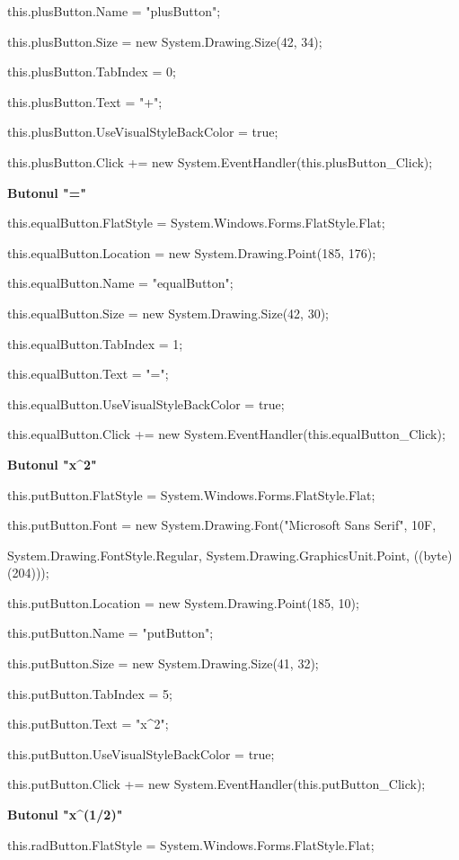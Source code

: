     this.plusButton.Name = "plusButton";
    
    this.plusButton.Size = new System.Drawing.Size(42, 34);
    
    this.plusButton.TabIndex = 0;
    
    this.plusButton.Text = "+";
    
    this.plusButton.UseVisualStyleBackColor = true;
    
    this.plusButton.Click += new System.EventHandler(this.plusButton_Click);

	
	\textbf{Butonul "="}
	
	this.equalButton.FlatStyle = System.Windows.Forms.FlatStyle.Flat;
    
    this.equalButton.Location = new System.Drawing.Point(185, 176);
    
    this.equalButton.Name = "equalButton";
    
    this.equalButton.Size = new System.Drawing.Size(42, 30);
    
    this.equalButton.TabIndex = 1;
    
    this.equalButton.Text = "=";
   
   this.equalButton.UseVisualStyleBackColor = true;
   
   this.equalButton.Click += new System.EventHandler(this.equalButton_Click);
   
  
   \textbf{Butonul "x^2"}
   
   
   this.putButton.FlatStyle = System.Windows.Forms.FlatStyle.Flat;
   
   this.putButton.Font = new System.Drawing.Font("Microsoft Sans Serif", 10F, 
   
   System.Drawing.FontStyle.Regular, System.Drawing.GraphicsUnit.Point, ((byte)(204)));
   
   this.putButton.Location = new System.Drawing.Point(185, 10);
   
   this.putButton.Name = "putButton";
  
   this.putButton.Size = new System.Drawing.Size(41, 32);
   
   this.putButton.TabIndex = 5;
   
   this.putButton.Text = "x^2";
   
   this.putButton.UseVisualStyleBackColor = true;
   
   this.putButton.Click += new System.EventHandler(this.putButton_Click);
   
   \textbf{Butonul "x^(1/2)"}
   
	this.radButton.FlatStyle = System.Windows.Forms.FlatStyle.Flat;
    
